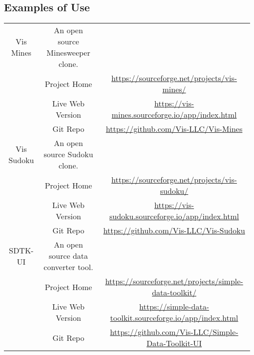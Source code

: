 \documentclass[11pt]{article}
\begin{document}
\subsection{Examples of Use}
\begin{center}
\begin{tabular}{ | c | c | c | }
\hline
Vis Mines & An open source Minesweeper clone. \\
& Project Home & \href{https://sourceforge.net/projects/vis-mines/}{https://sourceforge.net/projects/vis-mines/} \\
& Live Web Version & \href{https://vis-mines.sourceforge.io/app/index.html}{https://vis-mines.sourceforge.io/app/index.html} \\
& Git Repo & \href{https://github.com/Vis-LLC/Vis-Mines}{https://github.com/Vis-LLC/Vis-Mines} \\
\hline
Vis Sudoku & An open source Sudoku clone. \\
& Project Home & \href{https://sourceforge.net/projects/vis-sudoku/}{https://sourceforge.net/projects/vis-sudoku/} \\
& Live Web Version & \href{https://vis-sudoku.sourceforge.io/app/index.html}{https://vis-sudoku.sourceforge.io/app/index.html} \\
& Git Repo & \href{https://github.com/Vis-LLC/Vis-Sudoku}{https://github.com/Vis-LLC/Vis-Sudoku} \\
\hline
SDTK-UI & An open source data converter tool. \\
& Project Home & \href{https://sourceforge.net/projects/simple-data-toolkit/}{https://sourceforge.net/projects/simple-data-toolkit/} \\
& Live Web Version & \href{https://simple-data-toolkit.sourceforge.io/app/index.html}{https://simple-data-toolkit.sourceforge.io/app/index.html} \\
& Git Repo & \href{https://github.com/Vis-LLC/Simple-Data-Toolkit-UI}{https://github.com/Vis-LLC/Simple-Data-Toolkit-UI} \\
\hline
\end{tabular}
\end{center}
\end{document}
